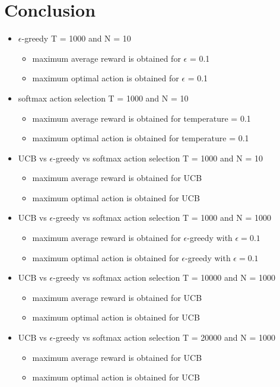 \documentclass[english]{article}
\begin{document}
\section{Conclusion}
\begin{itemize}
	\item $\epsilon$-greedy T = 1000 and N = 10 
	\begin{itemize}
		\item maximum average reward is obtained for $\epsilon$ = 0.1
		\item maximum optimal action is obtained for $\epsilon$ = 0.1
	\end{itemize}
	\item softmax action selection T = 1000 and N = 10
	\begin{itemize}
		\item maximum average reward is obtained for temperature = 0.1
		\item maximum optimal action is obtained for temperature = 0.1
	\end{itemize}
	\item UCB vs $\epsilon$-greedy vs softmax action selection T = 1000 and N = 10
	\begin{itemize}
		\item maximum average reward is obtained for UCB
		\item maximum optimal action is obtained for UCB
	\end{itemize}
	\item UCB vs $\epsilon$-greedy vs softmax action selection T = 1000 and N = 1000
	\begin{itemize}
		\item maximum average reward is obtained for $\epsilon$-greedy with $\epsilon = 0.1$
		\item maximum optimal action is obtained for $\epsilon$-greedy with $\epsilon = 0.1$
	\end{itemize}
	\item UCB vs $\epsilon$-greedy vs softmax action selection T = 10000 and N = 1000
	\begin{itemize}
		\item maximum average reward is obtained for UCB
		\item maximum optimal action is obtained for UCB
	\end{itemize}
	\item UCB vs $\epsilon$-greedy vs softmax action selection T = 20000 and N = 1000
	\begin{itemize}
		\item maximum average reward is obtained for UCB
		\item maximum optimal action is obtained for UCB
	\end{itemize}
\end{itemize}
\end{document}
